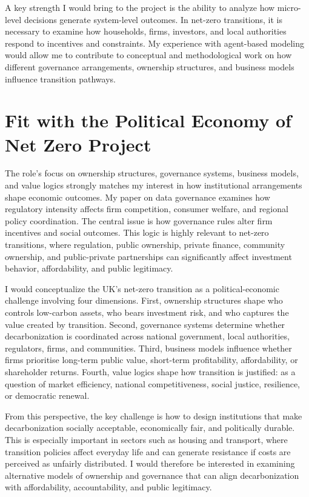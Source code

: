 \documentclass{nfr}
\begin{document}
A key strength I would bring to the project is the ability to analyze how micro-level decisions generate system-level outcomes. In net-zero transitions, it is necessary to examine how households, firms, investors, and local authorities respond to incentives and constraints. My experience with agent-based modeling would allow me to contribute to conceptual and methodological work on how different governance arrangements, ownership structures, and business models influence transition pathways.

\section*{Fit with the Political Economy of Net Zero Project}

The role's focus on ownership structures, governance systems, business models, and value logics strongly matches my interest in how institutional arrangements shape economic outcomes. My paper on data governance examines how regulatory intensity affects firm competition, consumer welfare, and regional policy coordination. The central issue is how governance rules alter firm incentives and social outcomes. This logic is highly relevant to net-zero transitions, where regulation, public ownership, private finance, community ownership, and public-private partnerships can significantly affect investment behavior, affordability, and public legitimacy.

I would conceptualize the UK's net-zero transition as a political-economic challenge involving four dimensions. First, ownership structures shape who controls low-carbon assets, who bears investment risk, and who captures the value created by transition. Second, governance systems determine whether decarbonization is coordinated across national government, local authorities, regulators, firms, and communities. Third, business models influence whether firms prioritise long-term public value, short-term profitability, affordability, or shareholder returns. Fourth, value logics shape how transition is justified: as a question of market efficiency, national competitiveness, social justice, resilience, or democratic renewal.

From this perspective, the key challenge is how to design institutions that make decarbonization socially acceptable, economically fair, and politically durable. This is especially important in sectors such as housing and transport, where transition policies affect everyday life and can generate resistance if costs are perceived as unfairly distributed. I would therefore be interested in examining alternative models of ownership and governance that can align decarbonization with affordability, accountability, and public legitimacy.
\end{document}
